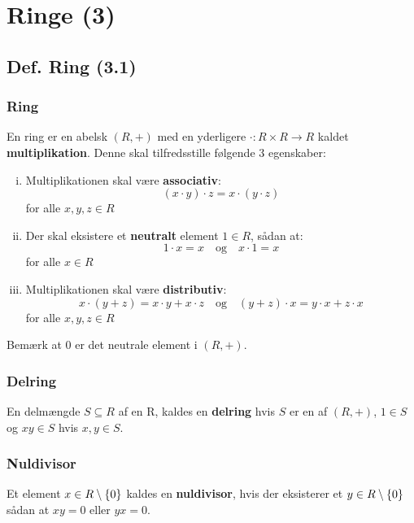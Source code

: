 \section{Ringe (3)}
\subsection{Def. Ring (3.1)}
\label{Def. Ring}
\subsubsection{Ring}
\label{Ring}
En ring er en abelsk  $(R,+)$ med en yderligere
 $\cdot: R \times R \rightarrow R$ kaldet
\textbf{multiplikation}. Denne skal tilfredsstille følgende 3 egenskaber:

\begin{enumerate}[(i)]
  \item Multiplikationen skal være \textbf{associativ}:
  \begin{equation*}
  (x \cdot y) \cdot z = x \cdot (y \cdot z)
  \end{equation*}
  for alle $x,y,z \in R$
  
  \item Der skal eksistere et \textbf{neutralt} element $1 \in R$, sådan at:
  \begin{equation*}
  1 \cdot x = x \quad \text{og}\quad x \cdot 1 = x
  \end{equation*}
  for alle $x \in R$
  
  \item Multiplikationen skal være \textbf{distributiv}:
  \begin{equation*}
  x \cdot(y + z) = x \cdot y + x \cdot z \quad \text{og}\quad (y + z) \cdot x =
  y \cdot x + z \cdot x
  \end{equation*}
  for alle $x,y,z \in R$
\end{enumerate}
Bemærk at 0 er det neutrale element i $(R, +)$.

\subsubsection{Delring}
\label{Delring}
En delmængde $S \subseteq R$ af en  R, kaldes en \textbf{delring}
hvis $S$ er en  af $(R, +)$, $1 \in S$ og $xy \in S$ hvis
$x, y \in S$.

\subsubsection{Nuldivisor}
\label{Nuldivisor}
Et element $x \in R \setminus \{ 0 \}$ kaldes en \textbf{nuldivisor}, hvis der
eksisterer et $y \in R \setminus \{ 0 \}$ sådan at $xy = 0$ eller $yx = 0$.

